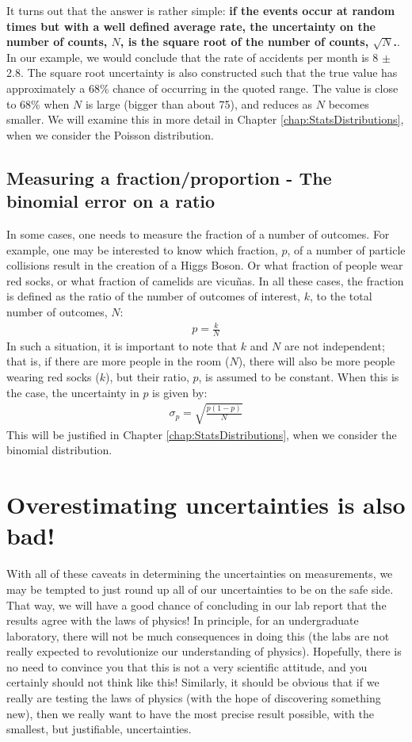 It turns out that the answer is rather simple: \textbf{if the events occur at random times but with a well defined average rate, the uncertainty on the number of counts, $N$, is the square root of the number of counts, $\sqrt{N}$.}. In our example, we would conclude that the rate of accidents per month is 8 $\pm$ 2.8. The square root uncertainty is also constructed such that the true value has approximately a 68\% chance of occurring in the quoted range. The value is close to 68\% when $N$ is large (bigger than about 75), and reduces as $N$ becomes smaller. We will examine this in more detail in Chapter \ref{chap:StatsDistributions}, when we consider the Poisson distribution.

\subsection{Measuring a fraction/proportion - The binomial error on a ratio}
In some cases, one needs to measure the fraction of a number of outcomes. For example, one may be interested to know which fraction, $p$, of a number of particle collisions result in the creation of a Higgs Boson. Or what fraction of people wear red socks, or what fraction of camelids are vicu\~nas. In all these cases, the fraction is defined as the ratio of the number of outcomes of interest, $k$, to the total number of outcomes, $N$:
\begin{align}
p=\frac{k}{N}
\end{align}
In such a situation, it is important to note that $k$ and $N$ are not independent; that is, if there are more people in the room ($N$), there will also be more people wearing red socks ($k$), but their ratio, $p$, is assumed to be constant. When this is the case, the uncertainty in $p$ is given by:
\begin{align}
\sigma_p = \sqrt{\frac{p(1-p)}{N}}
\end{align}
This will be justified in Chapter \ref{chap:StatsDistributions}, when we consider the binomial distribution.
\section{Overestimating uncertainties is also bad!}
With all of these caveats in determining the uncertainties on measurements, we may be tempted to just round up all of our uncertainties to be on the safe side. That way, we will have a good chance of concluding in our lab report that the results agree with the laws of physics! In principle, for an undergraduate laboratory, there will not be much consequences in doing this (the labs are not really expected to revolutionize our understanding of physics). Hopefully, there is no need to convince you that this is not a very scientific attitude, and you certainly should not think like this! Similarly, it should be obvious that if we really are testing the laws of physics (with the hope of discovering something new), then we really want to have the most precise result possible, with the smallest, but justifiable, uncertainties.

